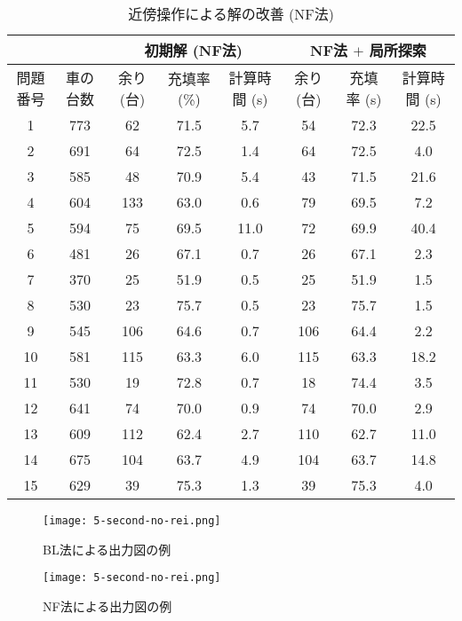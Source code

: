 \begin{table}[b]
    \centering
    \caption{近傍操作による解の改善 (NF法)}
    \label{review-local-nf}
    \begin{tabular}{cccccccc}
    \hline
        & & \multicolumn{3}{c}{初期解 (NF法)} & \multicolumn{3}{c}{NF法 $+$ 局所探索} \\
    \hline
    問題番号 & 車の台数  & 余り (台)  & 充填率 (\%) & 計算時間 (s) & 余り (台)  & 充填率 (s)  & 計算時間 (s)  \\
    \hline
    1    & 773  & 62      & 71.5     &  5.7     & 54      & 72.3     & 22.5       \\
    2    & 691  & 64      & 72.5     &  1.4     & 64      & 72.5     & 4.0      \\
    3    & 585  & 48      & 70.9     &  5.4     & 43      & 71.5     & 21.6       \\
    4    & 604  & 133     & 63.0     &  0.6     & 79      & 69.5     & 7.2      \\
    5    & 594  & 75      & 69.5     &  11.0    & 72      & 69.9     & 40.4       \\
    6    & 481  & 26      & 67.1     & 0.7      & 26      & 67.1     & 2.3          \\
    7    & 370  & 25      & 51.9     & 0.5      & 25      & 51.9     & 1.5       \\
    8    & 530  & 23      & 75.7     & 0.5      & 23      & 75.7     & 1.5       \\
    9    & 545  & 106     & 64.6     & 0.7      & 106     & 64.4     & 2.2        \\
    10   & 581  & 115     & 63.3     & 6.0      & 115     & 63.3     & 18.2       \\
    11   & 530  & 19      & 72.8     & 0.7      & 18      & 74.4     & 3.5      \\
    12   & 641  & 74      & 70.0     & 0.9      & 74      & 70.0     & 2.9       \\
    13   & 609  & 112     & 62.4     & 2.7      & 110     & 62.7     & 11.0       \\
    14   & 675  & 104     & 63.7     & 4.9      & 104     & 63.7     & 14.8      \\
    15   & 629  & 39      & 75.3     & 1.3      & 39      & 75.3     & 4.0      \\
    \hline
    \end{tabular}
\end{table}


\begin{figure}[p]
    \texttt{[image: 5-second-no-rei.png]}
    \caption{BL法による出力図の例}
    \label{second-no-rei}
\end{figure}

\begin{figure}[p]
    \texttt{[image: 5-second-no-rei.png]}
    \caption{NF法による出力図の例}
    \label{nf-norei}
\end{figure}

